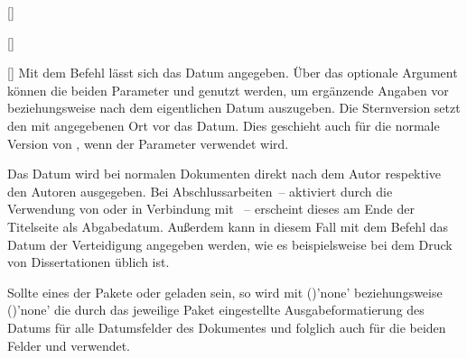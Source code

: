 \begin{Declaration*}{}
\begin{Declaration*}{}
\begin{Declaration*}{}
\begin{Declaration}{[]}
\begin{Declaration}[v2.05]{%
  []%
}
\begin{Declaration}[v2.05]{%
}
\begin{Declaration}[v2.05]{%
}
\begin{Declaration}[v2.05]{%
}
\begin{Declaration}{[]}
\printdeclarationlist%
%
%
%
%
Mit dem Befehl  lässt sich das Datum angegeben. 
Über das optionale Argument können die beiden Parameter 
 und  genutzt werden, um 
ergänzende Angaben vor beziehungsweise nach dem eigentlichen Datum auszugeben. 
Die Sternversion  setzt den mit  angegebenen Ort vor 
das Datum. Dies geschieht auch für die normale Version von , wenn 
der Parameter  verwendet wird.

Das Datum wird bei normalen Dokumenten direkt nach dem Autor respektive den 
Autoren ausgegeben. Bei Abschlussarbeiten~-- aktiviert durch die Verwendung von 
 oder  in Verbindung mit ~-- 
erscheint dieses am Ende der Titelseite als Abgabedatum. Außerdem kann in 
diesem Fall mit dem Befehl das Datum der Verteidigung 
angegeben werden, wie es beispielsweise bei dem Druck von Dissertationen üblich 
ist.

Sollte eines der Pakete  oder  geladen 
sein, so wird mit ()'none' beziehungsweise 
()'none' die durch das jeweilige Paket 
eingestellte Ausgabeformatierung des Datums für alle Datumsfelder des 
Dokumentes und folglich auch für die beiden Felder  und 
 verwendet.
\end{Declaration}
\end{Declaration}
\end{Declaration}
\end{Declaration}
\end{Declaration}
\end{Declaration}


\end{Declaration*}
\end{Declaration*}
\end{Declaration*}
